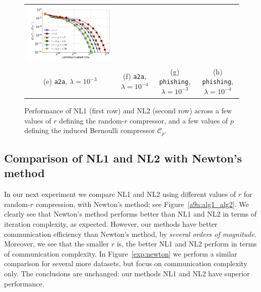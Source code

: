 \documentclass[10pt]{article}
\newcommand{\cC}{{\mathcal{C}}}
\begin{document}
\begin{figure}[ht]
\begin{center}
{\begin{tabular}{cccc}
				\includegraphics[width = 0.23 \textwidth]{LogReg/phishing/Lambda=1e-4/phishing_nl2_bits_lmb=0.0001.pdf}
				\\
				(e) {\tt a2a}, $\lambda=10^{-3}$ &(f) {\tt a2a}, $\lambda=10^{-4}$ & (g) {\tt phishing}, $\lambda=10^{-3}$ &(h) {\tt phishing}, $\lambda=10^{-4}$
		\end{tabular}}
		\caption{Performance of {\sf NL1} (first row) and {\sf NL2} (second row) across a few  values of $r$ defining the random-$r$ compressor, and a few values of $p$ defining the induced Bernoulli compressor $\cC_p$. }
		\label{exp:NL1_NL2}
	\end{center}
	\vskip -0.2in
\end{figure}




\subsection{Comparison of {\sf NL1} and {\sf NL2} with Newton's method}

In our next experiment we compare {\sf NL1} and {\sf NL2} using different values of $r$ for random-$r$ compression, with Newton's method; see Figure~\ref{a9a:alg1_alg2}. We clearly see that Newton's method performs better than {\sf NL1} and {\sf NL2} in terms of iteration complexity, as expected. However, our methods have better communication efficiency than Newton's method, by {\em several orders of magnitude}. Moreover, we see that the smaller $r$ is, the better {\sf NL1} and {\sf NL2} perform in terms of communication complexity. In  Figure~\ref{exp:newton} we perform a similar comparison for several more datasets, but focus on communication complexity only. The conclusions are unchanged: our methods  {\sf NL1} and {\sf NL2} have superior performance.
\end{document}
